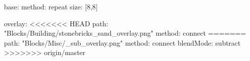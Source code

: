 base:
  method: repeat
  size: [8,8]

overlay:
<<<<<<< HEAD
  path: "Blocks/Building/stonebricks_sand_overlay.png"
  method: connect
=======
  path: "Blocks/Misc/_sub_overlay.png"
  method: connect
  blendMode: subtract
>>>>>>> origin/master
